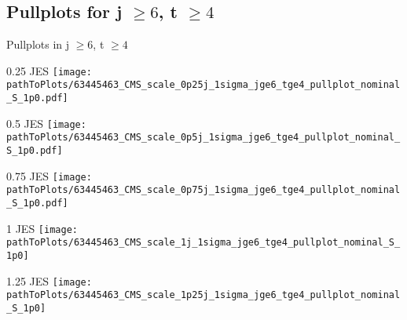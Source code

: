 \subsection{Pullplots for j $\geq 6$, t $\geq 4$}
\begin{frame}{Pullplots in j $\geq 6$, t $\geq 4$}
\begin{minipage}{0.25\textwidth}
\begin{block}{\num[round-precision=2]{0.25} JES}
\texttt{[image: \\pathToPlots/63445463\_CMS\_scale\_0p25j\_1sigma\_jge6\_tge4\_pullplot\_nominal\_S\_1p0.pdf]}\\
\end{block}

\end{minipage}
\hfill
\begin{minipage}{0.25\textwidth}
\begin{block}{\num[round-precision=2]{0.5} JES}
\texttt{[image: \\pathToPlots/63445463\_CMS\_scale\_0p5j\_1sigma\_jge6\_tge4\_pullplot\_nominal\_S\_1p0.pdf]}\\
\end{block}

\end{minipage}
\hfill
\begin{minipage}{0.25\textwidth}
\begin{block}{\num[round-precision=2]{0.75} JES}
\texttt{[image: \\pathToPlots/63445463\_CMS\_scale\_0p75j\_1sigma\_jge6\_tge4\_pullplot\_nominal\_S\_1p0.pdf]}\\
\end{block}
\end{minipage}
\hfill

\begin{minipage}{0.25\textwidth}
\begin{block}{1 JES}
\texttt{[image: \\pathToPlots/63445463\_CMS\_scale\_1j\_1sigma\_jge6\_tge4\_pullplot\_nominal\_S\_1p0]}\\
\end{block}

\end{minipage}
\hfill
\begin{minipage}{0.25\textwidth}
\begin{block}{\num[round-precision=2]{1.25} JES}
\texttt{[image: \\pathToPlots/63445463\_CMS\_scale\_1p25j\_1sigma\_jge6\_tge4\_pullplot\_nominal\_S\_1p0]}\\
\end{block}
\end{minipage}
\end{frame}


